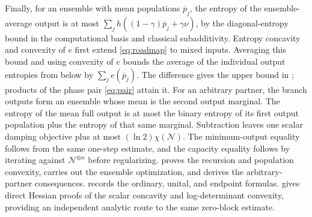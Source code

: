 \documentclass[11pt]{article}
\theoremstyle{remark}
\numberwithin{equation}{section}
\begin{document}
Finally, for an ensemble with mean populations $\overline p_j$, the
entropy of the ensemble-average output is at most
$\sum_j h((1-\gamma)\overline p_j+\gamma\nu)$, by the diagonal-entropy bound in
the computational basis and classical subadditivity. Entropy concavity
and convexity of $e$ first extend \eqref{eq:roadmap} to mixed inputs.
Averaging this bound and using convexity of $e$ bounds the average of
the individual output entropies from below by
$\sum_j e(\overline p_j)$. The difference gives the upper bound in
; products of the phase pair \eqref{eq:pair} attain it.
For an arbitrary partner, the branch outputs form an ensemble whose
mean is the second output marginal. The entropy of the mean full output
is at most the binary entropy of its first output population plus the
entropy of that same marginal. Subtraction leaves one scalar damping
objective plus at most $(\ln2)\chi(\mathcal N)$. The minimum-output
equality follows from the same one-step estimate, and the capacity
equality follows by iterating against $\mathcal N^{\otimes n}$ before
regularizing.
 proves the recursion and population convexity,
 carries out the ensemble optimization, and
 derives the arbitrary-partner consequences.
 records the ordinary, unital, and endpoint formulas.
 gives direct Hessian proofs of the scalar
concavity and log-determinant convexity, providing an independent
analytic route to the same zero-block estimate.







\appendix


\end{document}
